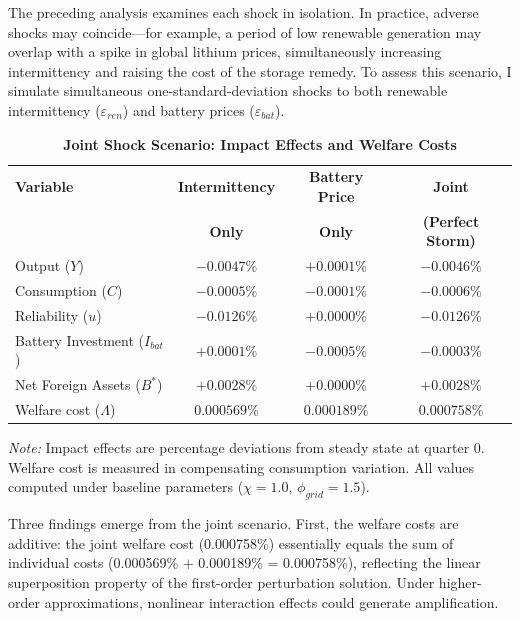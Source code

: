 \documentclass[12pt, a4paper]{article}
\begin{document}
The preceding analysis examines each shock in isolation. In practice, adverse shocks may coincide---for example, a period of low renewable generation may overlap with a spike in global lithium prices, simultaneously increasing intermittency and raising the cost of the storage remedy. To assess this scenario, I simulate simultaneous one-standard-deviation shocks to both renewable intermittency ($\varepsilon_{ren}$) and battery prices ($\varepsilon_{bat}$).

\begin{table}[H]
    \centering
    \caption{\textbf{Joint Shock Scenario: Impact Effects and Welfare Costs}}
    \label{tab:joint_shock}
    \renewcommand{\arraystretch}{1.3}
    \begin{tabular}{l c c c}
        \toprule
        \textbf{Variable} & \textbf{Intermittency} & \textbf{Battery Price} & \textbf{Joint} \\
        & \textbf{Only} & \textbf{Only} & \textbf{(Perfect Storm)} \\
        \midrule
        Output ($Y$) & $-0.0047\%$ & $+0.0001\%$ & $-0.0046\%$ \\
        Consumption ($C$) & $-0.0005\%$ & $-0.0001\%$ & $-0.0006\%$ \\
        Reliability ($u$) & $-0.0126\%$ & $+0.0000\%$ & $-0.0126\%$ \\
        Battery Investment ($I_{bat}$) & $+0.0001\%$ & $-0.0005\%$ & $-0.0003\%$ \\
        Net Foreign Assets ($B^*$) & $+0.0028\%$ & $+0.0000\%$ & $+0.0028\%$ \\
        \midrule
        Welfare cost ($\Lambda$) & $0.000569\%$ & $0.000189\%$ & $0.000758\%$ \\
        \bottomrule
    \end{tabular}
    \vspace{0.2cm}
    \parbox{\textwidth}{\footnotesize \textit{Note:} Impact effects are percentage deviations from steady state at quarter 0. Welfare cost is measured in compensating consumption variation. All values computed under baseline parameters ($\chi = 1.0$, $\phi_{grid} = 1.5$).}
\end{table}

Three findings emerge from the joint scenario. First, the welfare costs are additive: the joint welfare cost (0.000758\%) essentially equals the sum of individual costs (0.000569\% $+$ 0.000189\% = 0.000758\%), reflecting the linear superposition property of the first-order perturbation solution. Under higher-order approximations, nonlinear interaction effects could generate amplification.
\end{document}
